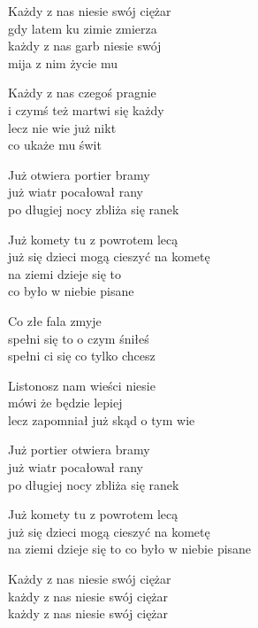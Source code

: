 \begin{text}
    Każdy z nas niesie swój ciężar\\
    gdy latem ku zimie zmierza\\
    każdy z nas garb niesie swój\\
    mija z nim życie mu

    Każdy z nas czegoś pragnie\\
    i czymś też martwi się każdy\\
    lecz nie wie już nikt\\
    co ukaże mu świt

    Już otwiera portier bramy\\
    już wiatr pocałował rany\\
    po długiej nocy zbliża się ranek

    Już komety tu z powrotem lecą\\
    już się dzieci mogą cieszyć na kometę\\
    na ziemi dzieje się to\\
    co było w niebie pisane

    Co złe fala zmyje\\
    spełni się to o czym śniłeś\\
    spełni ci się co tylko chcesz

    Listonosz nam wieści niesie\\
    mówi że będzie lepiej\\
    lecz zapomniał już skąd o tym wie

    Już portier otwiera bramy\\
    już wiatr pocałował rany\\
    po długiej nocy zbliża się ranek

    Już komety tu z powrotem lecą\\
    już się dzieci mogą cieszyć na kometę\\
    na ziemi dzieje się to co było w niebie pisane

    Każdy z nas niesie swój ciężar\\
    każdy z nas niesie swój ciężar\\
    każdy z nas niesie swój ciężar
\end{text}
